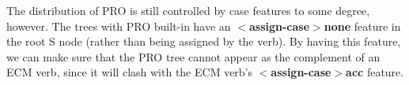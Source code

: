 The distribution of PRO is still controlled by case features to some degree, 
however. The trees with PRO built-in have an {\bf $<$assign-case$>$none} 
feature in the root S node (rather than being assigned by the verb). By having 
this feature, we can make sure that the PRO tree cannot appear as the 
complement of an ECM verb, since it will clash with the ECM verb's {\bf $<$assign-case$>$acc} feature. 
 
 
 
 
 
 
 
 
 
 
